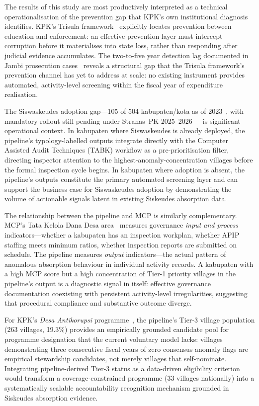\documentclass[3p,times,procedia]{elsarticle}
\begin{document}
The results of this study are most productively interpreted as a technical operationalisation of the prevention gap that KPK's own institutional diagnosis identifies. KPK's Trisula framework~\cite{ref4} explicitly locates prevention between education and enforcement: an effective prevention layer must intercept corruption before it materialises into state loss, rather than responding after judicial evidence accumulates. The two-to-five year detection lag documented in Jambi prosecution cases~\cite{ref15,ref16,ref17,ref18} reveals a structural gap that the Trisula framework's prevention channel has yet to address at scale: no existing instrument provides automated, activity-level screening within the fiscal year of expenditure realisation.

The Siswaskeudes adoption gap---105 of 504 kabupaten/kota as of 2023~\cite{ref6}, with mandatory rollout still pending under Stranas~PK 2025--2026~\cite{ref7}---is significant operational context. In kabupaten where Siswaskeudes is already deployed, the pipeline's typology-labelled outputs integrate directly with the Computer Assisted Audit Techniques (TABK) workflow as a pre-prioritisation filter, directing inspector attention to the highest-anomaly-concentration villages before the formal inspection cycle begins. In kabupaten where adoption is absent, the pipeline's outputs constitute the primary automated screening layer and can support the business case for Siswaskeudes adoption by demonstrating the volume of actionable signals latent in existing Siskeudes absorption data.

The relationship between the pipeline and MCP is similarly complementary. MCP's Tata Kelola Dana Desa area~\cite{ref8} measures governance \textit{input and process} indicators---whether a kabupaten has an inspection workplan, whether APIP staffing meets minimum ratios, whether inspection reports are submitted on schedule. The pipeline measures \textit{output} indicators---the actual pattern of anomalous absorption behaviour in individual activity records. A kabupaten with a high MCP score but a high concentration of Tier-1 priority villages in the pipeline's output is a diagnostic signal in itself: effective governance documentation coexisting with persistent activity-level irregularities, suggesting that procedural compliance and substantive outcome diverge.

For KPK's \textit{Desa Antikorupsi} programme~\cite{ref5}, the pipeline's Tier-3 village population (263 villages, 19.3\%) provides an empirically grounded candidate pool for programme designation that the current voluntary model lacks: villages demonstrating three consecutive fiscal years of zero consensus anomaly flags are empirical stewardship candidates, not merely villages that self-nominate. Integrating pipeline-derived Tier-3 status as a data-driven eligibility criterion would transform a coverage-constrained programme (33 villages nationally) into a systematically scalable accountability recognition mechanism grounded in Siskeudes absorption evidence.
\end{document}
